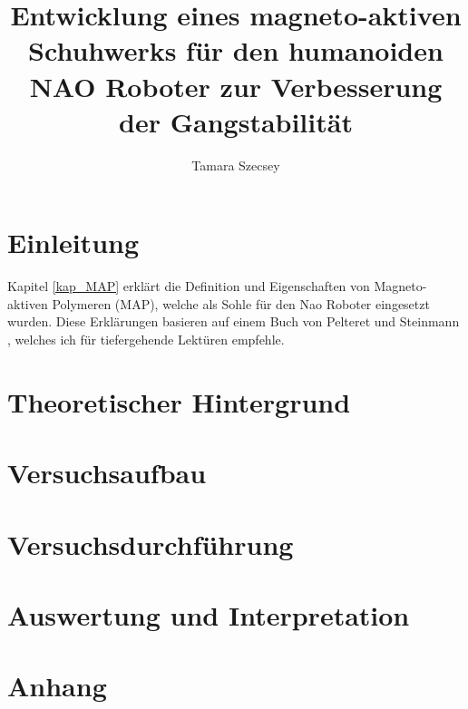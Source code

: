 \documentclass[a4paper,
DIV=13,
12pt,
BCOR=10mm,
department=FakEI,
oneside,
parskip=half,
automark,
]{OTHRartcl}
\title{Entwicklung eines magneto-aktiven Schuhwerks für den humanoiden NAO Roboter zur Verbesserung der Gangstabilität}
\author{Tamara Szecsey}
\begin{document}
\maketitle
\makedeclaration

\thispagestyle{empty}
\tableofcontents	
\clearpage	
\setcounter{page}{1}

\section{Einleitung}
%
Kapitel \ref{kap_MAP} erklärt die Definition und Eigenschaften von Magneto-aktiven Polymeren (MAP), welche als Sohle für den Nao Roboter eingesetzt wurden. Diese Erklärungen basieren auf einem Buch von Pelteret und Steinmann \cite{map2020}, welches ich für tiefergehende Lektüren empfehle. 
\newpage
\section{Theoretischer Hintergrund}

\newpage
\section{Versuchsaufbau}

%
\newpage
\section{Versuchsdurchführung}



\newpage
\section{Auswertung und Interpretation}


%
%
%
\FloatBarrier
\newpage
\section{Anhang} \label{Anhang}


\FloatBarrier
\newpage
\clearpage	
\printbibliography
\end{document}

